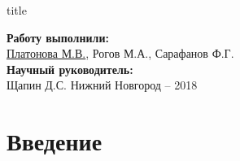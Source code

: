 
\newcommand{\sq}[1]{\tikz{\draw[draw=#1,fill=#1] (0,0) rectangle (0.7em,0.7em);}}
\usepackage{xcolor}
  
\begin{frame}[plain]
	\centering
	\vspace{2cm}
	\begin{beamercolorbox}[sep=8pt,center]{title}
		\bf{}\inserttitle
	\end{beamercolorbox}
	\vspace{0.5cm}
	\normalsize \textbf{Работу выполнили:}\\
	\large
	\underline{Платонова М.В.}, %
	{Рогов М.А.,}
	Сарафанов Ф.Г. %
	\\ 
	\vspace{0.5cm}
	\normalsize{\textbf{Научный руководитель:}\\}
	\large{Щапин Д.С.}
	\vfill
	\small{Нижний Новгород -- 2018}
\end{frame}

\section{Введение}
